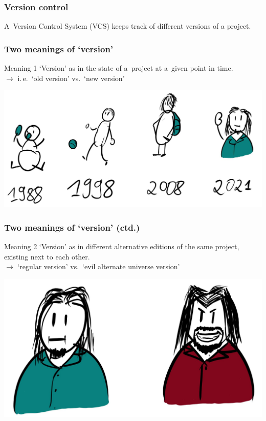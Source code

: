\documentclass[12pt]{beamer}
\begin{document}
\begin{frame}
  \frametitle{Version control}

  A~\alert{Version Control System} (VCS) keeps track of different versions of
  a project.
\end{frame}

\begin{frame}
  \frametitle{Two meanings of `version'}

  \begin{block}{Meaning 1}
    `Version' as in the state of a~project at a~given point in time.\\
    $\rightarrow$ i.\,e.\ `old version' vs.\ `new version'
    \begin{center}
      \includegraphics[width=.75\textwidth]{images/versions-over-time.jpg}
    \end{center}
  \end{block}
\end{frame}

\begin{frame}
  \frametitle{Two meanings of `version' (ctd.)}

  \begin{block}{Meaning 2}
    `Version' as in different alternative editions of the same project, existing
    next to each other.\\
    $\to$ `regular version' vs.\ `evil alternate universe version'
    \begin{center}
      \includegraphics[width=.65\textwidth]{images/versions-parallel.jpg}
    \end{center}
  \end{block}
\end{frame}
\end{document}
